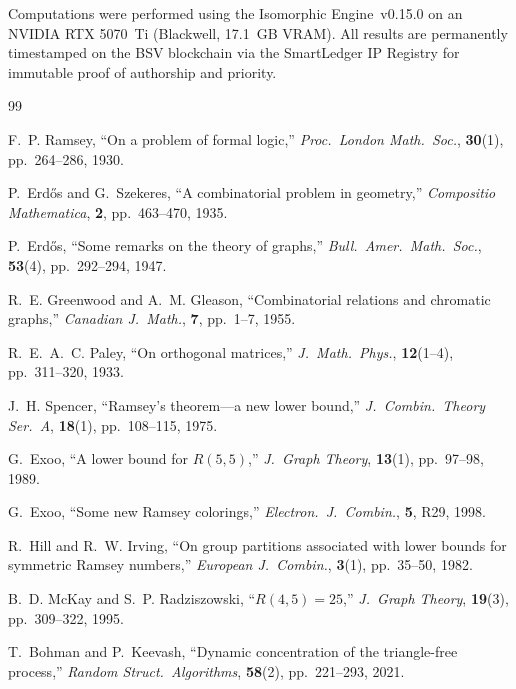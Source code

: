 \documentclass[12pt,a4paper]{article}
\theoremstyle{definition}
\theoremstyle{remark}
\begin{document}
Computations were performed using the Isomorphic Engine~v0.15.0 on an NVIDIA RTX 5070~Ti (Blackwell, 17.1~GB VRAM).  All results are permanently timestamped on the BSV blockchain via the SmartLedger IP Registry for immutable proof of authorship and priority.


\begin{thebibliography}{99}

F.~P. Ramsey,
``On a problem of formal logic,''
\textit{Proc.\ London Math.\ Soc.}, \textbf{30}(1), pp.~264--286, 1930.

P.~Erd\H{o}s and G.~Szekeres,
``A combinatorial problem in geometry,''
\textit{Compositio Mathematica}, \textbf{2}, pp.~463--470, 1935.

P.~Erd\H{o}s,
``Some remarks on the theory of graphs,''
\textit{Bull.\ Amer.\ Math.\ Soc.}, \textbf{53}(4), pp.~292--294, 1947.

R.~E. Greenwood and A.~M. Gleason,
``Combinatorial relations and chromatic graphs,''
\textit{Canadian J.\ Math.}, \textbf{7}, pp.~1--7, 1955.

R.~E.~A.~C. Paley,
``On orthogonal matrices,''
\textit{J.\ Math.\ Phys.}, \textbf{12}(1--4), pp.~311--320, 1933.

J.~H. Spencer,
``Ramsey's theorem---a new lower bound,''
\textit{J.\ Combin.\ Theory Ser.~A}, \textbf{18}(1), pp.~108--115, 1975.

G.~Exoo,
``A lower bound for $R(5,5)$,''
\textit{J.\ Graph Theory}, \textbf{13}(1), pp.~97--98, 1989.

G.~Exoo,
``Some new Ramsey colorings,''
\textit{Electron.\ J.\ Combin.}, \textbf{5}, R29, 1998.

R.~Hill and R.~W. Irving,
``On group partitions associated with lower bounds for symmetric Ramsey numbers,''
\textit{European J.\ Combin.}, \textbf{3}(1), pp.~35--50, 1982.

B.~D. McKay and S.~P. Radziszowski,
``$R(4,5) = 25$,''
\textit{J.\ Graph Theory}, \textbf{19}(3), pp.~309--322, 1995.

T.~Bohman and P.~Keevash,
``Dynamic concentration of the triangle-free process,''
\textit{Random Struct.\ Algorithms}, \textbf{58}(2), pp.~221--293, 2021.


\end{thebibliography}
\end{document}
